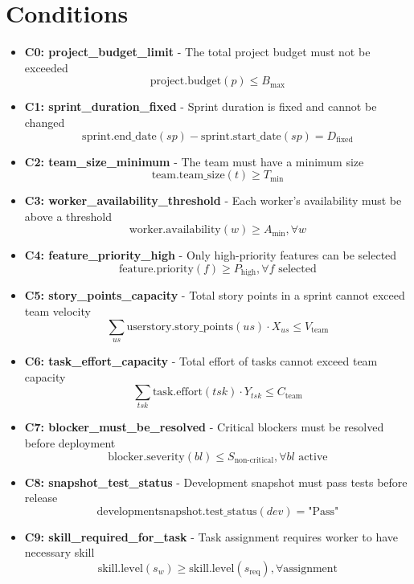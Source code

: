 \documentclass[11pt]{article}
\begin{document}
\section{Conditions}
\begin{itemize}
    \item \textbf{C0: project\_budget\_limit} - The total project budget must not be exceeded
          \[ \text{project.budget}(p) \leq B_{\text{max}} \]
    \item \textbf{C1: sprint\_duration\_fixed} - Sprint duration is fixed and cannot be changed
          \[ \text{sprint.end\_date}(sp) - \text{sprint.start\_date}(sp) = D_{\text{fixed}} \]
    \item \textbf{C2: team\_size\_minimum} - The team must have a minimum size
          \[ \text{team.team\_size}(t) \geq T_{\text{min}} \]
    \item \textbf{C3: worker\_availability\_threshold} - Each worker's availability must be above a threshold
          \[ \text{worker.availability}(w) \geq A_{\text{min}}, \forall w \]
    \item \textbf{C4: feature\_priority\_high} - Only high-priority features can be selected
          \[ \text{feature.priority}(f) \geq P_{\text{high}}, \forall f \text{ selected} \]
    \item \textbf{C5: story\_points\_capacity} - Total story points in a sprint cannot exceed team velocity
          \[ \sum_{us} \text{userstory.story\_points}(us) \cdot X_{us} \leq V_{\text{team}} \]
    \item \textbf{C6: task\_effort\_capacity} - Total effort of tasks cannot exceed team capacity
          \[ \sum_{tsk} \text{task.effort}(tsk) \cdot Y_{tsk} \leq C_{\text{team}} \]
    \item \textbf{C7: blocker\_must\_be\_resolved} - Critical blockers must be resolved before deployment
          \[ \text{blocker.severity}(bl) \leq S_{\text{non-critical}}, \forall bl \text{ active} \]
    \item \textbf{C8: snapshot\_test\_status} - Development snapshot must pass tests before release
          \[ \text{developmentsnapshot.test\_status}(dev) = \text{"Pass"} \]
    \item \textbf{C9: skill\_required\_for\_task} - Task assignment requires worker to have necessary skill
          \[ \text{skill.level}(s_{w}) \geq \text{skill.level}(s_{\text{req}}), \forall \text{assignment} \]
\end{itemize}
\end{document}
